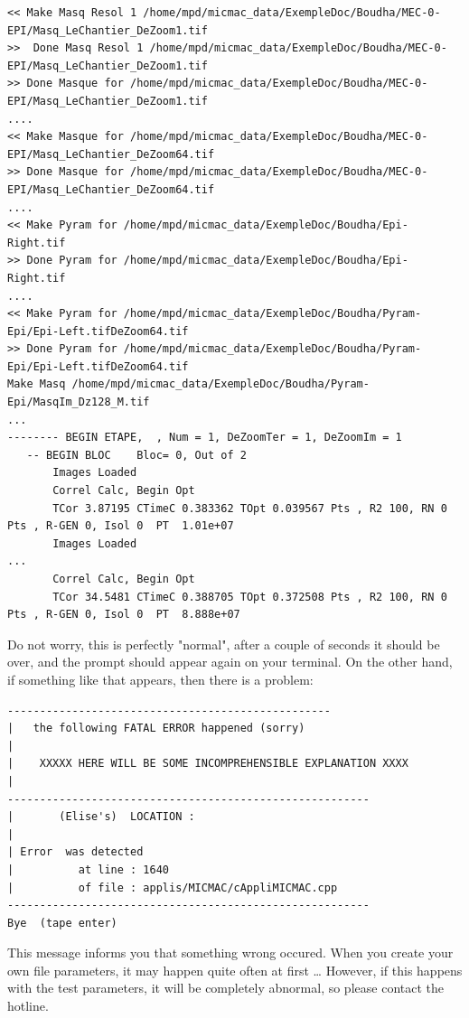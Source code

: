 {\scriptsize
\begin{verbatim}
<< Make Masq Resol 1 /home/mpd/micmac_data/ExempleDoc/Boudha/MEC-0-EPI/Masq_LeChantier_DeZoom1.tif
>>  Done Masq Resol 1 /home/mpd/micmac_data/ExempleDoc/Boudha/MEC-0-EPI/Masq_LeChantier_DeZoom1.tif
>> Done Masque for /home/mpd/micmac_data/ExempleDoc/Boudha/MEC-0-EPI/Masq_LeChantier_DeZoom1.tif
....
<< Make Masque for /home/mpd/micmac_data/ExempleDoc/Boudha/MEC-0-EPI/Masq_LeChantier_DeZoom64.tif
>> Done Masque for /home/mpd/micmac_data/ExempleDoc/Boudha/MEC-0-EPI/Masq_LeChantier_DeZoom64.tif
....
<< Make Pyram for /home/mpd/micmac_data/ExempleDoc/Boudha/Epi-Right.tif
>> Done Pyram for /home/mpd/micmac_data/ExempleDoc/Boudha/Epi-Right.tif
....
<< Make Pyram for /home/mpd/micmac_data/ExempleDoc/Boudha/Pyram-Epi/Epi-Left.tifDeZoom64.tif
>> Done Pyram for /home/mpd/micmac_data/ExempleDoc/Boudha/Pyram-Epi/Epi-Left.tifDeZoom64.tif
Make Masq /home/mpd/micmac_data/ExempleDoc/Boudha/Pyram-Epi/MasqIm_Dz128_M.tif
...
-------- BEGIN ETAPE,  , Num = 1, DeZoomTer = 1, DeZoomIm = 1
   -- BEGIN BLOC    Bloc= 0, Out of 2
       Images Loaded
       Correl Calc, Begin Opt
       TCor 3.87195 CTimeC 0.383362 TOpt 0.039567 Pts , R2 100, RN 0 Pts , R-GEN 0, Isol 0  PT  1.01e+07
       Images Loaded
...
       Correl Calc, Begin Opt
       TCor 34.5481 CTimeC 0.388705 TOpt 0.372508 Pts , R2 100, RN 0 Pts , R-GEN 0, Isol 0  PT  8.888e+07
\end{verbatim}
}

Do not worry, this is perfectly "normal", after a couple of seconds it should be over, and the
prompt should appear again on your terminal. On the other hand, if something like
that appears, then there is a problem:

{\scriptsize
\begin{verbatim}
--------------------------------------------------
|   the following FATAL ERROR happened (sorry)    
|                                                 
|    XXXXX HERE WILL BE SOME INCOMPREHENSIBLE EXPLANATION XXXX
|                                                 
--------------------------------------------------------
|       (Elise's)  LOCATION :                           
|                                                       
| Error  was detected 
|          at line : 1640
|          of file : applis/MICMAC/cAppliMICMAC.cpp
--------------------------------------------------------
Bye  (tape enter)
\end{verbatim}
}


This message informs you that something wrong occured. When you
create your own file parameters, it may happen quite often at first \dots
However, if this happens with the test parameters,
it will be completely abnormal, so please contact the hotline.


